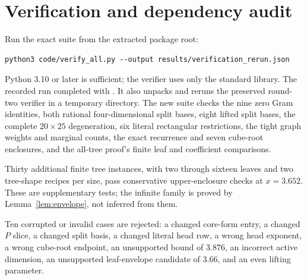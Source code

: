 \documentclass[11pt]{article}
\theoremstyle{definition}\newtheorem{definition}[theorem]{Definition}
\theoremstyle{remark}\newtheorem{remark}[theorem]{Remark}
\newcommand{\file}[1]{\texttt{\detokenize{#1}}}
\begin{document}
\section{Verification and dependency audit}\label{sec:verification}

Run the exact suite from the extracted package root:
\begin{lstlisting}
python3 code/verify_all.py --output results/verification_rerun.json
\end{lstlisting}
Python 3.10 or later is sufficient; the verifier uses only the standard library. The recorded run completed with \file{ALL CHECKS PASSED}. It also unpacks and reruns the preserved round-two verifier in a temporary directory. The new suite checks the nine zero Gram identities, both rational four-dimensional split bases, eight lifted split bases, the complete $20\times25$ degeneration, six literal rectangular restrictions, the tight graph weights and marginal counts, the exact recurrence and seven cube-root enclosures, and the all-tree proof's finite leaf and coefficient comparisons.

Thirty additional finite tree instances, with two through sixteen leaves and two tree-shape recipes per size, pass conservative upper-enclosure checks at $x=3.652$. These are supplementary tests; the infinite family is proved by Lemma~\ref{lem:envelope}, not inferred from them.

Ten corrupted or invalid cases are rejected: a changed core-form entry, a changed $P$ slice, a changed split basis, a changed literal head row, a wrong head exponent, a wrong cube-root endpoint, an unsupported bound of $3.876$, an incorrect active dimension, an unsupported leaf-envelope candidate of $3.66$, and an even lifting parameter.
\end{document}
